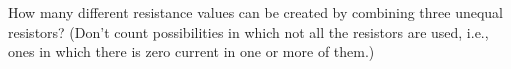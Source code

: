         How many different resistance values can be created by
        combining three unequal resistors? (Don't count possibilities
        in which not all the resistors are used, i.e., ones in which there
        is zero current in one or more of them.)

